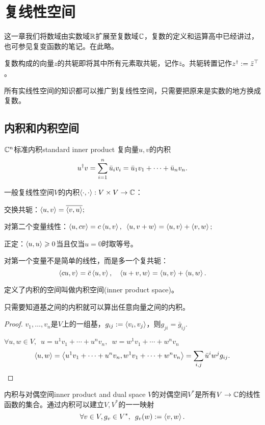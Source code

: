 \chapter{复线性空间}
\label{chap:complex linear space}

这一章我们将数域由实数域$\mathbb R$扩展至复数域$\mathbb C$，复数的定义和运算高中已经讲过，也可参见复变函数的笔记。在此略。

复数构成的向量$z$的共轭即将其中所有元素取共轭，记作$\bar z$。共轭转置记作$z^\dagger:=\bar z^\top$。

所有实线性空间的知识都可以推广到复线性空间，只需要把原来是实数的地方换成复数。
\section{内积和内积空间}
\begin{definition}{$\mathbb C^n$标准内积}{standard inner product}
	复向量$u,v$的内积
	\[
		u^\dagger v=\sum_{i=1}^n\bar u_iv_i=\bar u_1v_1+\cdots+\bar u_nv_n.
	\]
\end{definition}
一般复线性空间$V$的内积$\left\langle \cdot,\cdot\right\rangle:V\times V\to\mathbb C$：
\begin{compactitem}
	\item 交换共轭：$\left\langle u,v\right\rangle=\overline{\left\langle v,u\right\rangle};$
	\item 对第二个变量线性：$\left\langle u,cv\right\rangle=c\left\langle u,v\right\rangle,\enspace \left\langle u,v+w\right\rangle=\left\langle u,v\right\rangle+\left\langle v,w\right\rangle;$
	\item 正定：$\left\langle u,u\right\rangle\geqslant 0$当且仅当$u=0$时取等号。
\end{compactitem}
\begin{remark}
	对第一个变量不是简单的线性，而是多一个复共轭：
	\[
		\left\langle cu,v\right\rangle=\bar c\left\langle u,v\right\rangle,\quad \left\langle u+v,w\right\rangle=\left\langle u,v\right\rangle+\left\langle u,w\right\rangle.
	\]
\end{remark}
定义了内积的空间叫做内积空间(inner product space)。
\begin{theorem}{}{}
	只需要知道基之间的内积就可以算出任意向量之间的内积。
\end{theorem}
\begin{proof}
	$v_1,\ldots,v_n$是$V$上的一组基，$g_{ij}:=\left\langle v_i,v_j\right\rangle$，则$g_{ji}=\bar g_{ij}.$
	
	$\forall u,w\in V,\enspace u=u^1v_1+\cdots+u^nv_n,\enspace w=w^1v_1+\cdots+w^nv_n$
	\[
		\left\langle u,w\right\rangle=\left\langle u^1v_1+\cdots+u^nv_n,w^1v_1+\cdots+w^nv_n\right\rangle=\sum_{i,j}\bar u^iw^jg_{ij}.
		\qedhere
	\]
\end{proof}
\begin{example}{内积与对偶空间}{inner product and dual space}
	$V$的对偶空间$V^\ast$是所有$V\to\mathbb C$的线性函数的集合。通过内积可以建立$V,V^\ast$的一一映射
	\[
		\forall v\in V,g_v\in V^\ast,\enspace g_v(w):=\left\langle v,w\right\rangle
.	\]
\end{example}
